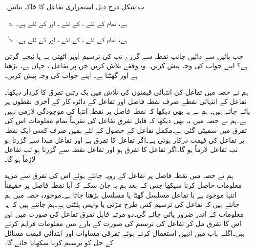 ب:\quad شکل 
درج ذیل استمراری تفاعل  کا خاکہ بنائیں۔
\begin{enumerate}[a.]
\item
{} ہے، تمام  کے لئے ،  کے لئے ، اور  کے لئے  ہے۔
\item
{} ہے، تمام  کے لئے ،  کے لئے ، اور  کے لئے  ہے۔ 
\end{enumerate}
جب  بائیں سے دائیں جانب نقطہ  سے گزرے تب  کی ترسیم اوپر اٹھتی ہے یا نیچے گرتی ہے؟ اپنے جواب کی وجہ پیش کریں۔
وہ وقفے تلاش کریں جن پر تفاعل ، جہاں  ہے، بڑھتا ہے اور گھٹتا ہے۔ اپنے جواب کی وجہ پیش کریں۔


ہم نے حصہ  میں تفاعل کی انتہائی قیمتوں کی تلاش میں یک رتبی تفرق کا کردار دیکھا۔ تفاعل کے انتہائی نقطے صرف نقطہ فاصل اور تفاعل  کے دائرہ کار کے آخری نقطوں  پر پائے جاتے ہیں۔ ہم نے یہ بھی دیکھا کہ نقطہ فاصل پر نقطہ انتہا کی موجودگی لازمی نہیں ہے۔ہم نے حصہ  میں یہ بھی دیکھا کہ قابل تفرق تفاعل کی تقریباً تمام معلومات اس کی تفرق میں سمیٹی گئی ہے۔مکمل تفاعل کے حصول کے لئے  ہمیں صرف کسی ایک نقطہ پر تفاعل کی قیمت درکار ہوتی ہے۔اگر تفاعل کا تفرق  ہے اور تفاعل مبدا سے گزرتا ہو تب تفاعل لازماً  ہو گا۔اگر تفاعل کا تفرق  ہو اور تفاعل نقطہ  سے گزرتا ہو تب تفاعل لازماً   ہو گا۔

ہم نے حصہ  میں نقطہ فاصل پر تفاعل کے رویہ جانتے ہوئے اس کی تفرق سے مزید معلومات حاصل کرنا سیکھا جس کے بعد ہم یہ جان سکے کہ آیا نقطہ فاصل پر حقیقتاً انتہا موجود ہے یا تفاعل مسلسل گھٹا یا مسلسل بڑھتا جاتا ہے۔موجودہ حصہ میں ہم جانتے  ہیں کہ تفاعل  کی ترسیم  کس طرح مڑتی یا واپس پلٹتی ہے۔ہم جانتے ہیں کہ یہ معلومات  کے اندر ضرور  پائی جائے گی۔دو مرتبہ قابل تفرق تفاعل کی صورت میں   اور اس کا تفرق  مل کر تفاعل کی ترسیم کی صورت کے بارے میں معلومات فراہم کرتے ہیں۔اگلے باب میں  انہیں استعمال کرتے ہوئے تفرقی مساوات اور ابتدائی قیمت مسائل کے حل کو ترسیم کرنا سکھایا جائے گا۔

